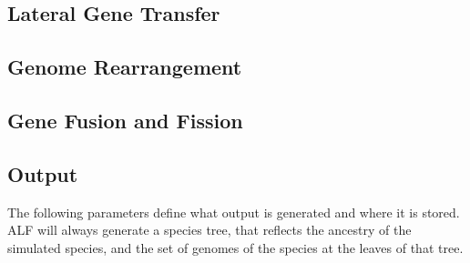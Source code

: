 \documentclass[11pt]{article}
\begin{document}
\subsection{Lateral Gene Transfer}

\subsection{Genome Rearrangement}  

\subsection{Gene Fusion and Fission}

\subsection{Output}
The following parameters define what output is generated and where it is stored. ALF will always generate a species tree, that reflects the ancestry of the simulated species, and the set of genomes of the species at the leaves of that tree.
\end{document}
